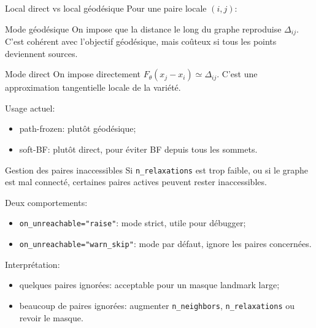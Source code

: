\documentclass[aspectratio=169]{beamer}
\newcommand{\Dtarget}{\Delta}
\newcommand{\Fmetric}{F_\theta}
\begin{document}
\begin{frame}{Local direct vs local géodésique}
  Pour une paire locale $(i,j)$:

  \vspace{0.2cm}
  \begin{block}{Mode géodésique}
    On impose que la distance le long du graphe reproduise $\Dtarget_{ij}$.
    C'est cohérent avec l'objectif géodésique, mais coûteux si tous les points
    deviennent sources.
  \end{block}

  \begin{block}{Mode direct}
    On impose directement $\Fmetric(x_j-x_i)\simeq \Dtarget_{ij}$.
    C'est une approximation tangentielle locale de la variété.
  \end{block}

  \vspace{0.1cm}
  Usage actuel:
  \begin{itemize}
    \item path-frozen: plutôt géodésique;
    \item soft-BF: plutôt direct, pour éviter BF depuis tous les sommets.
  \end{itemize}
\end{frame}

\begin{frame}{Gestion des paires inaccessibles}
  Si \texttt{n\_relaxations} est trop faible, ou si le graphe est mal connecté,
  certaines paires actives peuvent rester inaccessibles.

  \vspace{0.2cm}
  Deux comportements:
  \begin{itemize}
    \item \texttt{on\_unreachable="raise"}: mode strict, utile pour débugger;
    \item \texttt{on\_unreachable="warn\_skip"}: mode par défaut, ignore les paires concernées.
  \end{itemize}

  \vspace{0.2cm}
  Interprétation:
  \begin{itemize}
    \item quelques paires ignorées: acceptable pour un masque landmark large;
    \item beaucoup de paires ignorées: augmenter \texttt{n\_neighbors},
      \texttt{n\_relaxations} ou revoir le masque.
  \end{itemize}
\end{frame}
\end{document}
